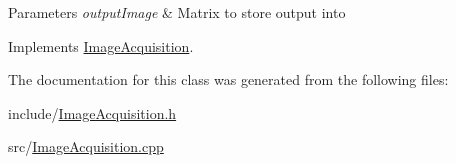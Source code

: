\begin{DoxyParams}{\-Parameters}
{\em output\-Image} & \-Matrix to store output into \\
\hline
\end{DoxyParams}


\-Implements \hyperlink{classImageAcquisition_a737392ecb0e777fd6be9690ecf91d116}{\-Image\-Acquisition}.



\-The documentation for this class was generated from the following files\-:\begin{DoxyCompactItemize}
\item 
include/\hyperlink{ImageAcquisition_8h}{\-Image\-Acquisition.\-h}\item 
src/\hyperlink{ImageAcquisition_8cpp}{\-Image\-Acquisition.\-cpp}\end{DoxyCompactItemize}
